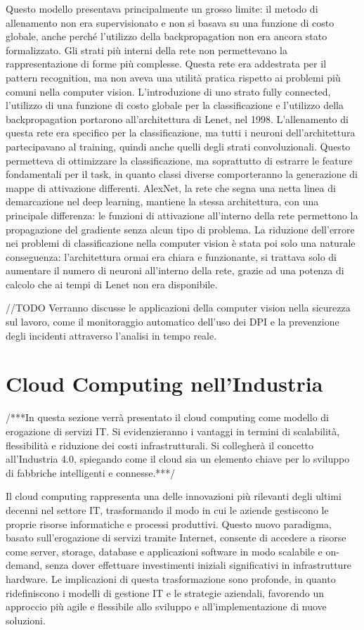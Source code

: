 Questo modello presentava principalmente un grosso limite: il metodo di allenamento non era supervisionato e non si basava su una funzione di costo globale, anche perché l'utilizzo della backpropagation non era ancora stato formalizzato. Gli strati più interni della rete non permettevano la rappresentazione di forme più complesse. Questa rete era addestrata per il pattern recognition, ma non aveva una utilità pratica rispetto ai problemi più comuni nella computer vision. L'introduzione di uno strato fully connected, l'utilizzo di una funzione di costo globale per la classificazione e l'utilizzo della backpropagation portarono all'architettura di Lenet, nel 1998. L'allenamento di questa rete era specifico per la classificazione, ma tutti i neuroni dell'architettura partecipavano al training, quindi anche quelli degli strati convoluzionali. Questo permetteva di ottimizzare la classificazione, ma soprattutto di estrarre le feature fondamentali per il task, in quanto classi diverse comporteranno la generazione di mappe di attivazione differenti. AlexNet, la rete che segna una netta linea di demarcazione nel deep learning, mantiene la stessa architettura, con una principale differenza: le funzioni di attivazione all'interno della rete permettono la propagazione del gradiente senza alcun tipo di problema. La riduzione dell'errore nei problemi di classificazione nella computer vision è stata poi solo una naturale conseguenza: l'architettura ormai era chiara e funzionante, si trattava solo di aumentare il numero di neuroni all'interno della rete, grazie ad una potenza di calcolo che ai tempi di Lenet non era disponibile.  
   

//TODO Verranno discusse le applicazioni della computer vision nella sicurezza sul lavoro, come il monitoraggio automatico dell'uso dei DPI e la prevenzione degli incidenti attraverso l'analisi in tempo reale.

\section{Cloud Computing nell'Industria}

/***In questa sezione verrà presentato il cloud computing come modello di erogazione di servizi IT. Si evidenzieranno i vantaggi in termini di scalabilità, flessibilità e riduzione dei costi infrastrutturali. Si collegherà il concetto all'Industria 4.0, spiegando come il cloud sia un elemento chiave per lo sviluppo di fabbriche intelligenti e connesse.***/

Il cloud computing rappresenta una delle innovazioni più rilevanti degli ultimi decenni nel settore IT, trasformando il modo in cui le aziende gestiscono le proprie risorse informatiche e processi produttivi. Questo nuovo paradigma, basato sull’erogazione di servizi tramite Internet, consente di accedere a risorse come server, storage, database e applicazioni software in modo scalabile e on-demand, senza dover effettuare investimenti iniziali significativi in infrastrutture hardware. Le implicazioni di questa trasformazione sono profonde, in quanto ridefiniscono i modelli di gestione IT e le strategie aziendali, favorendo un approccio più agile e flessibile allo sviluppo e all’implementazione di nuove soluzioni.

